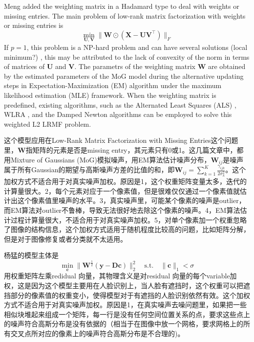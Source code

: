 \documentclass[10pt,twocolumn,letterpaper]{article}
\begin{document}
Meng \etal \cite{meng2013robust} added the weighting matrix in a Hadamard type to deal with weights or missing entries. The main problem of low-rank matrix factorization with weights or missing entries is
\begin{equation}
\min_{\mathbf{U},\mathbf{V}}\|\mathbf{W}\odot(\mathbf{X}-\mathbf{U}\mathbf{V}^{\top})\|_{F}
\end{equation}
If $p=1$, this problem is a NP-hard problem and can have several solutions (local minimum?) \cite{GillisGlineur}, this may be attributed to the lack of convexity of the norm in terms of matrices of $\mathbf{U}$ and $\mathbf{V}$. The parametrs of the weighting matrix $\mathbf{W}$ are obtained by the estimated parameters of the MoG model during the alternative updating steps in Expectation-Maximization (EM) algorithm under the maximum likelihood estimation (MLE) framework. When the weighting matrix is predefined, existing algorithms, such as the Alternated
Least Squares (ALS) \cite{de2003framework}, WLRA \cite{srebro2003weighted}, and the Damped Newton algorithms \cite{buchanan2005damped} can be employed to solve this weighted L2 LRMF problem. 

这个模型应用在Low-Rank Matrix Factorization with Missing Entries这个问题里，$\mathbf{W}$指矩阵的元素是否是missing entry，其元素只有0或1。这几篇文章中，都用Mixture of Gaussians (MoG)模拟噪声，用EM算法估计噪声分布，$\mathbf{W}_{ij}$是噪声属于所有Gaussian的期望与高斯噪声方差的比值的和，即$\mathbf{W}_{ij}=\sum_{k=1}^{K}\frac{\gamma_{ijk}}{2\sigma_{k}^{2}}$。这个加权方式不适合用于对真实噪声加权。原因是1，这个权重矩阵变量太多，迭代的计算量很大。2，每个元素对应于一个像素值，但是很难仅仅通过一个像素值就估计出这个像素值里噪声的水平。3，真实噪声里，可能某个像素的噪声是outlier，而EM算法对outlier不鲁棒，导致无法很好地去除这个像素的噪声。4，EM算法估计过程计算量很大，不适合用于对真实噪声加权。5，对单个像素加一个权重忽略了图像的结构信息，这个加权方式适用于随机程度比较高的问题，比如矩阵分解，但是对于图像修复或者分类就不太适用。

杨猛的模型\cite{yang2011robust}主体是
\begin{equation}
\min_{\mathbf{c}}\|\mathbf{W}^{\frac{1}{2}}(\mathbf{y}-\mathbf{D}\mathbf{c})\|_{2}^{2}
\quad
\text{s.t.}
\quad
\|\mathbf{c}\|_{1}<\sigma
\end{equation}
用权重矩阵左乘redidual 向量，其物理含义是对residual 向量的每个variable加权，这是因为这个模型主要用在人脸识别上，当人脸有遮挡时，这个权重可以把遮挡部分的像素值的权重变小，使得模型对于有遮挡的人脸识别依然有效。这个加权方式不适合用于对真实噪声加权。原因是1，在真实噪声去噪问题里，如果把一些相似块堆起来组成一个矩阵，每一行是没有任何空间位置关系的点，要求这些点上的噪声符合高斯分布是没有依据的（相当于在图像中放一个网格，要求网格上的所有交叉点所对应的像素上的噪声符合高斯分布是不合理的)。
\end{document}
